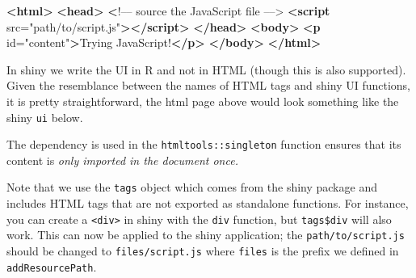 \documentclass[
  10pt,
]{krantz}
\makeatletter
\newenvironment{Shaded}{\begin{snugshade}}{\end{snugshade}}
\newcommand{\DataTypeTok}[1]{\textcolor[rgb]{0.27,0.27,0.27}{#1}}
\newcommand{\ErrorTok}[1]{\textcolor[rgb]{0.14,0.14,0.14}{\textbf{#1}}}
\newcommand{\KeywordTok}[1]{\textcolor[rgb]{0.27,0.27,0.27}{\textbf{#1}}}
\newcommand{\NormalTok}[1]{#1}
\newcommand{\OperatorTok}[1]{\textcolor[rgb]{0.43,0.43,0.43}{\textbf{#1}}}
\newcommand{\OtherTok}[1]{\textcolor[rgb]{0.37,0.37,0.37}{#1}}
\newcommand{\StringTok}[1]{\textcolor[rgb]{0.5,0.5,0.5}{#1}}
\newenvironment{kframe}{%
\medskip{}
\setlength{\fboxsep}{.8em}
 \def\at@end@of@kframe{}%
 \ifinner\ifhmode%
  \def\at@end@of@kframe{\end{minipage}}%
  \begin{minipage}{\columnwidth}%
 \fi\fi%
 \def\FrameCommand##1{\hskip\@totalleftmargin \hskip-\fboxsep
 \colorbox{shadecolor}{##1}\hskip-\fboxsep
     \hskip-\linewidth \hskip-\@totalleftmargin \hskip\columnwidth}%
 \MakeFramed {\advance\hsize-\width
   \@totalleftmargin\z@ \linewidth\hsize
   \@setminipage}}%
 {\par\unskip\endMakeFramed%
 \at@end@of@kframe}
\renewenvironment{Shaded}{\begin{kframe}}{\end{kframe}}
\makeatother
\begin{document}
\begin{Shaded}
\begin{Highlighting}[]
\KeywordTok{<html>}
  \KeywordTok{<head>}
    \ErrorTok{<}\NormalTok{!–– source the JavaScript file ––>}
    \KeywordTok{<script}\OtherTok{ src=}\StringTok{"path/to/script.js"}\KeywordTok{></script>}
  \KeywordTok{</head>}
  \KeywordTok{<body>}
    \KeywordTok{<p}\OtherTok{ id=}\StringTok{"content"}\KeywordTok{>}\NormalTok{Trying JavaScript!}\KeywordTok{</p>}
  \KeywordTok{</body>}
\KeywordTok{</html>}
\end{Highlighting}
\end{Shaded}

In shiny we write the UI in R and not in HTML (though this is also supported). Given the resemblance between the names of HTML tags and shiny UI functions, it is pretty straightforward, the html page above would look something like the shiny \texttt{ui} below.

\begin{Shaded}
\end{Shaded}

The dependency is used in the \texttt{htmltools::singleton} function ensures that its content is \emph{only imported in the document once.}

Note that we use the \texttt{tags} object which comes from the shiny package and includes HTML tags that are not exported as standalone functions. For instance, you can create a \texttt{\textless{}div\textgreater{}} in shiny with the \texttt{div} function, but \texttt{tags\$div} will also work. This can now be applied to the shiny application; the \texttt{path/to/script.js} should be changed to \texttt{files/script.js} where \texttt{files} is the prefix we defined in \texttt{addResourcePath}.
\end{document}
